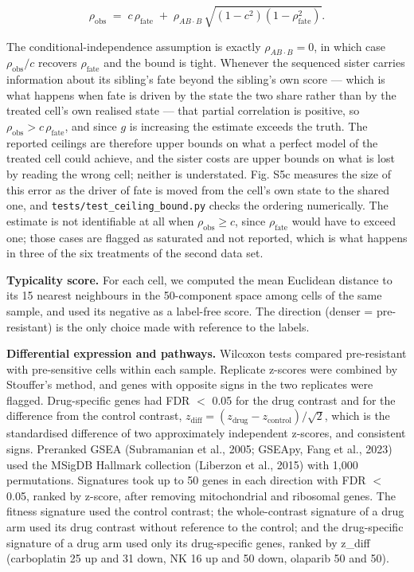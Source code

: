 \documentclass[11pt,a4paper]{article}
\begin{document}
\begin{equation}
\rho_{\text{obs}} \;=\; c\,\rho_{\text{fate}} \;+\; \rho_{AB\cdot B}\,\sqrt{(1-c^{2})(1-\rho_{\text{fate}}^{2})}.
\end{equation}

The conditional-independence assumption is exactly $\rho_{AB\cdot B} = 0$, in which case $\rho_{\text{obs}} / c$ recovers $\rho_{\text{fate}}$ and the bound is tight. Whenever the sequenced sister carries information about its sibling's fate beyond the sibling's own score --- which is what happens when fate is driven by the state the two share rather than by the treated cell's own realised state --- that partial correlation is positive, so $\rho_{\text{obs}} > c\,\rho_{\text{fate}}$, and since $g$ is increasing the estimate exceeds the truth. The reported ceilings are therefore upper bounds on what a perfect model of the treated cell could achieve, and the sister costs are upper bounds on what is lost by reading the wrong cell; neither is understated. Fig. S5c measures the size of this error as the driver of fate is moved from the cell's own state to the shared one, and \texttt{tests/test\_ceiling\_bound.py} checks the ordering numerically. The estimate is not identifiable at all when $\rho_{\text{obs}} \geq c$, since $\rho_{\text{fate}}$ would have to exceed one; those cases are flagged as saturated and not reported, which is what happens in three of the six treatments of the second data set.

\textbf{Typicality score.} For each cell, we computed the mean Euclidean distance to its 15 nearest neighbours in the 50-component space among cells of the same sample, and used its negative as a label-free score. The direction (denser = pre-resistant) is the only choice made with reference to the labels.

\textbf{Differential expression and pathways.} Wilcoxon tests compared pre-resistant with pre-sensitive cells within each sample. Replicate z-scores were combined by Stouffer's method, and genes with opposite signs in the two replicates were flagged. Drug-specific genes had FDR $<$ 0.05 for the drug contrast and for the difference from the control contrast, $z_{\text{diff}} = (z_{\text{drug}} - z_{\text{control}})/\sqrt{2}$, which is the standardised difference of two approximately independent z-scores, and consistent signs. Preranked GSEA (Subramanian et al., 2005; GSEApy, Fang et al., 2023) used the MSigDB Hallmark collection (Liberzon et al., 2015) with 1,000 permutations. Signatures took up to 50 genes in each direction with FDR $<$ 0.05, ranked by z-score, after removing mitochondrial and ribosomal genes. The fitness signature used the control contrast; the whole-contrast signature of a drug arm used its drug contrast without reference to the control; and the drug-specific signature of a drug arm used only its drug-specific genes, ranked by z\_diff (carboplatin 25 up and 31 down, NK 16 up and 50 down, olaparib 50 and 50).
\end{document}
